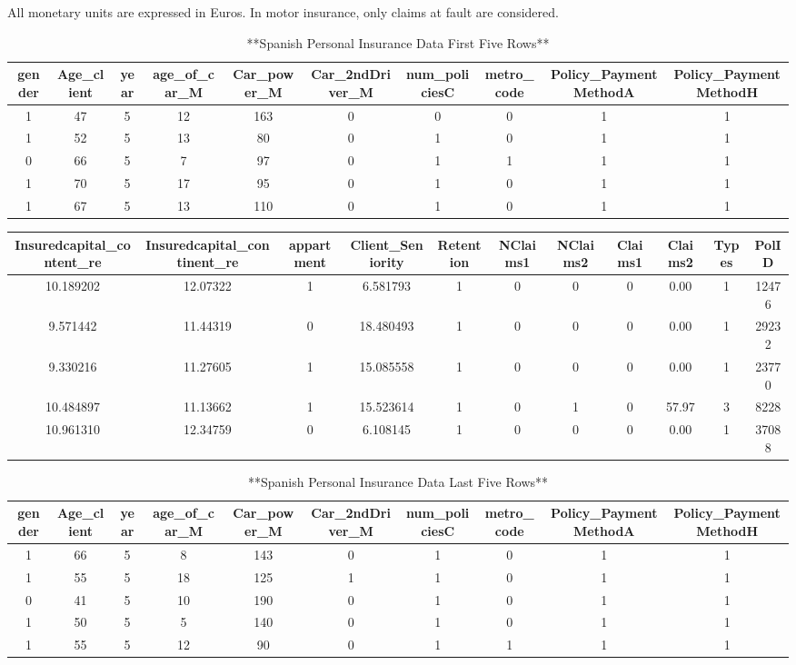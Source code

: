 \documentclass[
]{book}
\begin{document}
All monetary units are expressed in Euros. In motor insurance, only claims at fault are considered.

\begin{table}

\caption{\label{tab:PrintNumPersonalIns}**Spanish Personal Insurance  Data First Five Rows**}
\centering
\begin{tabular}[t]{c|c|c|c|c|c|c|c|c|c}
\hline
gender & Age\_client & year & age\_of\_car\_M & Car\_power\_M & Car\_2ndDriver\_M & num\_policiesC & metro\_code & Policy\_PaymentMethodA & Policy\_PaymentMethodH\\
\hline
1 & 47 & 5 & 12 & 163 & 0 & 0 & 0 & 1 & 1\\
\hline
1 & 52 & 5 & 13 & 80 & 0 & 1 & 0 & 1 & 1\\
\hline
0 & 66 & 5 & 7 & 97 & 0 & 1 & 1 & 1 & 1\\
\hline
1 & 70 & 5 & 17 & 95 & 0 & 1 & 0 & 1 & 1\\
\hline
1 & 67 & 5 & 13 & 110 & 0 & 1 & 0 & 1 & 1\\
\hline
\end{tabular}
\end{table}

\begin{tabular}{c|c|c|c|c|c|c|c|c|c|c}
\hline
Insuredcapital\_content\_re & Insuredcapital\_continent\_re & appartment & Client\_Seniority & Retention & NClaims1 & NClaims2 & Claims1 & Claims2 & Types & PolID\\
\hline
10.189202 & 12.07322 & 1 & 6.581793 & 1 & 0 & 0 & 0 & 0.00 & 1 & 12476\\
\hline
9.571442 & 11.44319 & 0 & 18.480493 & 1 & 0 & 0 & 0 & 0.00 & 1 & 29232\\
\hline
9.330216 & 11.27605 & 1 & 15.085558 & 1 & 0 & 0 & 0 & 0.00 & 1 & 23770\\
\hline
10.484897 & 11.13662 & 1 & 15.523614 & 1 & 0 & 1 & 0 & 57.97 & 3 & 8228\\
\hline
10.961310 & 12.34759 & 0 & 6.108145 & 1 & 0 & 0 & 0 & 0.00 & 1 & 37088\\
\hline
\end{tabular}

\begin{table}

\caption{\label{tab:PrintNumPersonalIns}**Spanish Personal Insurance Data Last Five Rows**}
\centering
\begin{tabular}[t]{c|c|c|c|c|c|c|c|c|c}
\hline
gender & Age\_client & year & age\_of\_car\_M & Car\_power\_M & Car\_2ndDriver\_M & num\_policiesC & metro\_code & Policy\_PaymentMethodA & Policy\_PaymentMethodH\\
\hline
1 & 66 & 5 & 8 & 143 & 0 & 1 & 0 & 1 & 1\\
\hline
1 & 55 & 5 & 18 & 125 & 1 & 1 & 0 & 1 & 1\\
\hline
0 & 41 & 5 & 10 & 190 & 0 & 1 & 0 & 1 & 1\\
\hline
1 & 50 & 5 & 5 & 140 & 0 & 1 & 0 & 1 & 1\\
\hline
1 & 55 & 5 & 12 & 90 & 0 & 1 & 1 & 1 & 1\\
\hline
\end{tabular}
\end{table}
\end{document}
